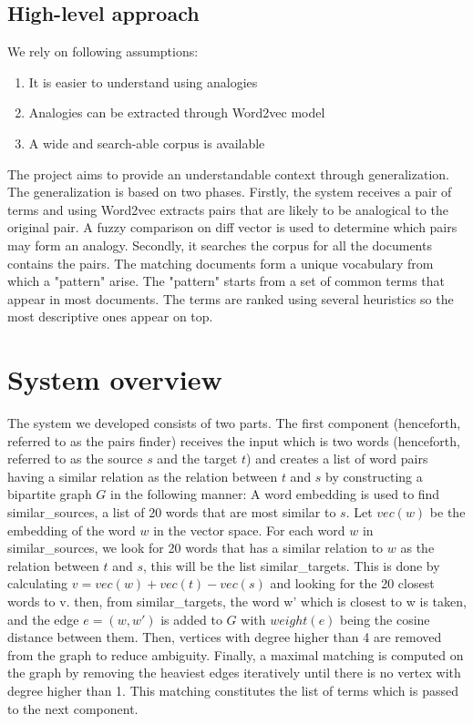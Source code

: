 \documentclass[11pt,a4paper]{article}
\begin{document}
\subsection{High-level approach}
We rely on following assumptions:
\begin{enumerate}
\item It is easier to understand using analogies
\item Analogies can be extracted through Word2vec model
\item A wide and search-able corpus is available
\end{enumerate}
The project aims to provide an understandable context through generalization. The generalization is based on two phases. Firstly, the system receives a pair of terms and using Word2vec extracts pairs that are likely to be analogical to the original pair. A fuzzy comparison on diff vector is used to determine which pairs may form an analogy. Secondly, it searches the corpus for all the documents contains the pairs. The matching documents form a unique vocabulary from which a "pattern" arise. The "pattern" starts from a set of common terms that appear in most documents. The terms are ranked using several heuristics so the most descriptive ones appear on top.
\section{System overview}
The system we developed consists of two parts. The first component (henceforth, referred to as the pairs finder) receives the input which is two words (henceforth, referred to as the source $s$ and the target $t$) and creates a list of word pairs having a similar relation as the relation between $t$ and $s$ by constructing a bipartite graph $G$ in the following manner: 
A word embedding is used to find similar\_sources, a list of 20 words that are most similar to $s$. Let $vec(w)$ be the embedding of the word $w$ in the vector space. For each word $w$ in similar\_sources, we look for 20 words that has a similar relation to $w$ as the relation between $t$ and $s$, this will be the list similar\_targets. This is done by calculating $v = vec(w) + vec(t) - vec(s)$ and looking for the 20 closest words to v. then, from similar\_targets, the word w' which is closest to w is taken, and the edge $e=(w, w')$ is added to $G$ with $weight(e)$ being the cosine distance between them. Then, vertices with degree higher than 4 are removed from the graph to reduce ambiguity. Finally, a maximal matching is computed on the graph by removing the heaviest edges iteratively until there is no vertex with degree higher than 1. This matching constitutes the list of terms which is passed to the next component.
\end{document}
